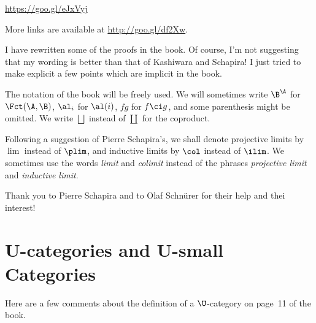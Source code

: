 \documentclass[12pt]{article}
\theoremstyle{remark}
\theoremstyle{definition}
\begin{document}
\nn\href{https://goo.gl/eJxVyj}{https://goo.gl/eJxVyj}





More links are available at \href{http://goo.gl/df2Xw}{http://goo.gl/df2Xw}. 

I have rewritten some of the proofs in the book. Of course, I'm not suggesting that my wording is better than that of Kashiwara and Schapira! I just tried to make explicit a few points which are implicit in the book. 


The notation of the book will be freely used. We will sometimes write $\B^\A$ for $\Fct(\A,\B)$, $\al_i$ for $\al(i)$, $fg$ for $f\ci g$, and some parenthesis might be omitted. We write $\bigsqcup$\index{$\bigsqcup$} instead of $\coprod$\index{$\coprod$} for the coproduct. 

Following a suggestion of Pierre Schapira's, we shall denote projective limits by $\lim$\index{$\lim$} instead of $\plim$\index{$\plim$}, and inductive limits by $\col$\index{$\col$} instead of $\ilim$\index{$\ilim$}. We sometimes use the words \emph{limit} and \emph{colimit} instead of the phrases \emph{projective limit} and \emph{inductive limit}.

Thank you to Pierre Schapira and to Olaf Schnürer for their help and thei interest!


\section{U-categories and U-small Categories}

Here are a few comments about the definition of a $\U$-category on page~11 of the book. 
\end{document}

